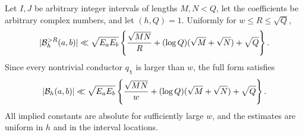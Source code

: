 \begin{theorem}
\label{thm:weighted-fixed-shift-large-sieve}
Let $I,J$ be arbitrary integer intervals of lengths $M,N<Q$, let the
coefficients be arbitrary complex numbers, and let $(h,Q)=1$.  Uniformly for
$w\leq R\leq\sqrt Q$,
\begin{equation}\label{eq:weighted-fixed-shift-tail-bound}
 |\mathcal B_h^{>R}(a,b)|
 \ll
 \sqrt{E_aE_b}
 \left\{
  \frac{\sqrt{MN}}R
  +(\log Q)(\sqrt M+\sqrt N)
  +\sqrt Q
 \right\}.
\end{equation}
Since every nontrivial conductor $q_\chi$ is larger than $w$, the full form
satisfies
\begin{equation}\label{eq:weighted-fixed-shift-full-bound}
 |\mathcal B_h(a,b)|
 \ll
 \sqrt{E_aE_b}
 \left\{
  \frac{\sqrt{MN}}w
  +(\log Q)(\sqrt M+\sqrt N)
  +\sqrt Q
 \right\}.
\end{equation}
All implied constants are absolute for sufficiently large $w$, and the
estimates are uniform in $h$ and in the interval locations.
\end{theorem}

